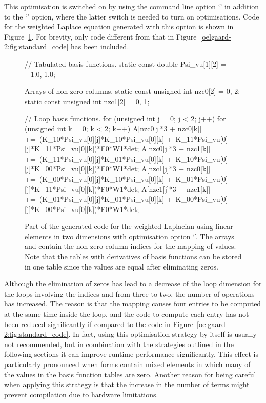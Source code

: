 This optimisation is switched on by using the command line option
`' in addition to the `' option,
where the latter switch is needed to turn on optimisations.
Code for the weighted Laplace equation generated with this option is shown in
Figure~\ref{oelgaard-2:fig:O_zeros_code}. For brevity, only code different
from that in
Figure~\ref{oelgaard-2:fig:standard_code} has been included.
%
\begin{figure}
\begin{code}
// Tabulated basis functions.
static const double Psi_vu[1][2] = \
{{-1.0, 1.0}};

Arrays of non-zero columns.
static const unsigned int nzc0[2] = {0, 2};
static const unsigned int nzc1[2] = {0, 1};

// Loop basis functions.
for (unsigned int j = 0; j < 2; j++)
{
 for (unsigned int k = 0; k < 2; k++)
 {
  A[nzc0[j]*3 + nzc0[k]] +=\
   (K_10*Psi_vu[0][j]*K_10*Psi_vu[0][k] +\
    K_11*Psi_vu[0][j]*K_11*Psi_vu[0][k])*F0*W1*det;
  A[nzc0[j]*3 + nzc1[k]] +=\
   (K_11*Psi_vu[0][j]*K_01*Psi_vu[0][k] +\
    K_10*Psi_vu[0][j]*K_00*Psi_vu[0][k])*F0*W1*det;
  A[nzc1[j]*3 + nzc0[k]] +=\
   (K_00*Psi_vu[0][j]*K_10*Psi_vu[0][k] +\
    K_01*Psi_vu[0][j]*K_11*Psi_vu[0][k])*F0*W1*det;
  A[nzc1[j]*3 + nzc1[k]] +=\
   (K_01*Psi_vu[0][j]*K_01*Psi_vu[0][k] +\
    K_00*Psi_vu[0][j]*K_00*Psi_vu[0][k])*F0*W1*det;
 }
}
\end{code}
\caption{Part of the generated code for the weighted Laplacian using linear
         elements in two dimensions with optimisation option
         `\emp{-f eliminate\_zeros}'.
         The arrays  and  contain the non-zero column
         indices for the mapping of values.
         Note that the tables with derivatives of basis functions can be
         stored in one table since the values are equal after eliminating
         zeros.}
\label{oelgaard-2:fig:O_zeros_code}
\end{figure}
%
Although the elimination of zeros has lead to a decrease of the loop dimension
for the loops involving the indices \emp{j} and \emp{k} from three to two,
the number of operations has increased.
The reason is that the mapping causes four entries to be computed at the same
time inside the loop, and the code to compute each entry has not been reduced
significantly if compared to the code in
Figure~\ref{oelgaard-2:fig:standard_code}.
In fact, using this optimisation strategy by itself is usually not recommended,
but in combination with the strategies outlined
in the following sections it can
improve runtime performance significantly.
This effect is particularly pronounced when forms contain mixed elements
in which many of the values in the basis function tables are zero.
Another reason for being careful when applying this strategy is that the
increase in the number of terms might prevent
\ffc{} compilation due to hardware limitations.
%

